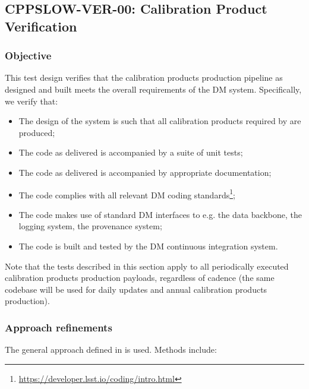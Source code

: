 \subsection{CPPSLOW-VER-00: Calibration Product Verification}
\label{cppslow-ver-00}

\subsubsection{Objective}

This test design verifies that the calibration products production pipeline as
designed and built meets the overall requirements of the DM system.
Specifically, we verify that:

\begin{itemize}

  \item{The design of the system is such that all calibration products
  required by  are produced;}

  \item{The code as delivered is accompanied by a suite of unit tests;}

  \item{The code as delivered is accompanied by appropriate documentation;}

  \item{The code complies with all relevant DM coding
  standards\footnote{\url{https://developer.lsst.io/coding/intro.html}};}

  \item{The code makes use of standard DM interfaces to e.g. the data
  backbone, the logging system, the provenance system;}

  \item{The code is built and tested by the DM continuous integration system.}

\end{itemize}

Note that the tests described in this section apply to all periodically
executed calibration products production payloads, regardless of cadence (the
same codebase will be used for daily updates and annual calibration products
production).

\subsubsection{Approach refinements}

The general approach defined in  is used. Methods include:

